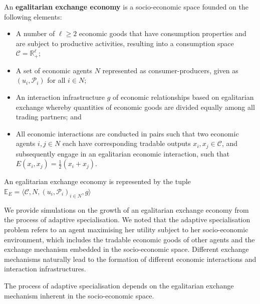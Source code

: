 \begin{definition}
An \textbf{egalitarian exchange economy} is a socio-economic space founded on the following elements:
\begin{itemize}
	\item A number of $\ell \geqslant 2$ economic goods that have consumption properties and are subject to productive activities, resulting into a consumption space $\mathcal{C} = \mathbb{R}^{\ell}_{+}$;

	\item A set of economic agents $N$ represented as consumer-producers, given as $\left( u_{i}, \mathcal{P}_{i} \right)$ for all $i \in N$;

	\item An interaction infrastructure $g$ of economic relationships based on egalitarian exchange whereby quantities of economic goods are divided equally among all trading partners; and

	\item All economic interactions are conducted in pairs such that two economic agents $i,j \in N$ each have corresponding tradable outputs $x_{i}, x_{j} \in \mathcal{C}$, and subsequently engage in an egalitarian economic interaction, such that $E(x_{i}, x_{j}) = \frac{1}{2} \left( x_{i} + x_{j} \right)$.
\end{itemize}
An egalitarian exchange economy is represented by the tuple $\mathbb{E}_{E} = \big \langle \mathcal{C}, N, (u_{i}, \mathcal{P}_{i})_{i \in N}, g \big \rangle$
\end{definition}

We provide simulations on the growth of an egalitarian exchange economy from the process of adaptive specialisation. We noted that the adaptive specialisation problem refers to an agent maximising her utility subject to her socio-economic environment, which includes the tradable economic goods of other agents and the exchange mechanism embedded in the socio-economic space. Different exchange mechanisms naturally lead to the formation of different economic interactions and interaction infrastructures.

The process of adaptive specialisation depends on the egalitarian exchange mechanism inherent in the socio-economic space.

